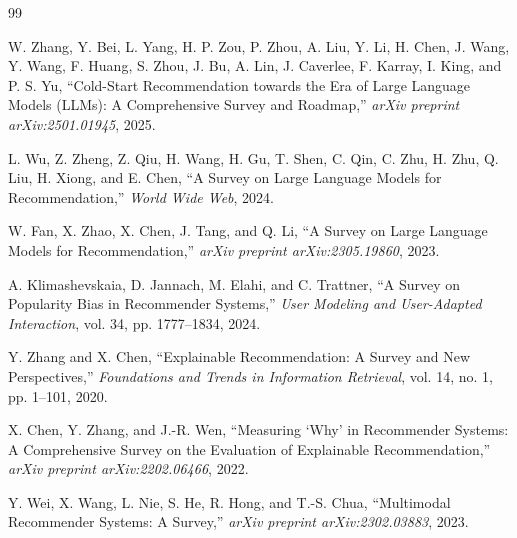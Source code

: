 \documentclass[12pt,a4paper]{article}
\begin{document}
\begin{thebibliography}{99}

W. Zhang, Y. Bei, L. Yang, H. P. Zou, P. Zhou, A. Liu, Y. Li, H. Chen, J. Wang, Y. Wang, F. Huang, S. Zhou, J. Bu, A. Lin, J. Caverlee, F. Karray, I. King, and P. S. Yu,
``Cold-Start Recommendation towards the Era of Large Language Models (LLMs): A Comprehensive Survey and Roadmap,''
\textit{arXiv preprint arXiv:2501.01945}, 2025.

L. Wu, Z. Zheng, Z. Qiu, H. Wang, H. Gu, T. Shen, C. Qin, C. Zhu, H. Zhu, Q. Liu, H. Xiong, and E. Chen,
``A Survey on Large Language Models for Recommendation,''
\textit{World Wide Web}, 2024.

W. Fan, X. Zhao, X. Chen, J. Tang, and Q. Li,
``A Survey on Large Language Models for Recommendation,''
\textit{arXiv preprint arXiv:2305.19860}, 2023.

A. Klimashevskaia, D. Jannach, M. Elahi, and C. Trattner,
``A Survey on Popularity Bias in Recommender Systems,''
\textit{User Modeling and User-Adapted Interaction}, vol. 34, pp. 1777--1834, 2024.

Y. Zhang and X. Chen,
``Explainable Recommendation: A Survey and New Perspectives,''
\textit{Foundations and Trends in Information Retrieval}, vol. 14, no. 1, pp. 1--101, 2020.

X. Chen, Y. Zhang, and J.-R. Wen,
``Measuring `Why' in Recommender Systems: A Comprehensive Survey on the Evaluation of Explainable Recommendation,''
\textit{arXiv preprint arXiv:2202.06466}, 2022.

Y. Wei, X. Wang, L. Nie, S. He, R. Hong, and T.-S. Chua,
``Multimodal Recommender Systems: A Survey,''
\textit{arXiv preprint arXiv:2302.03883}, 2023.

\end{thebibliography}
\end{document}
